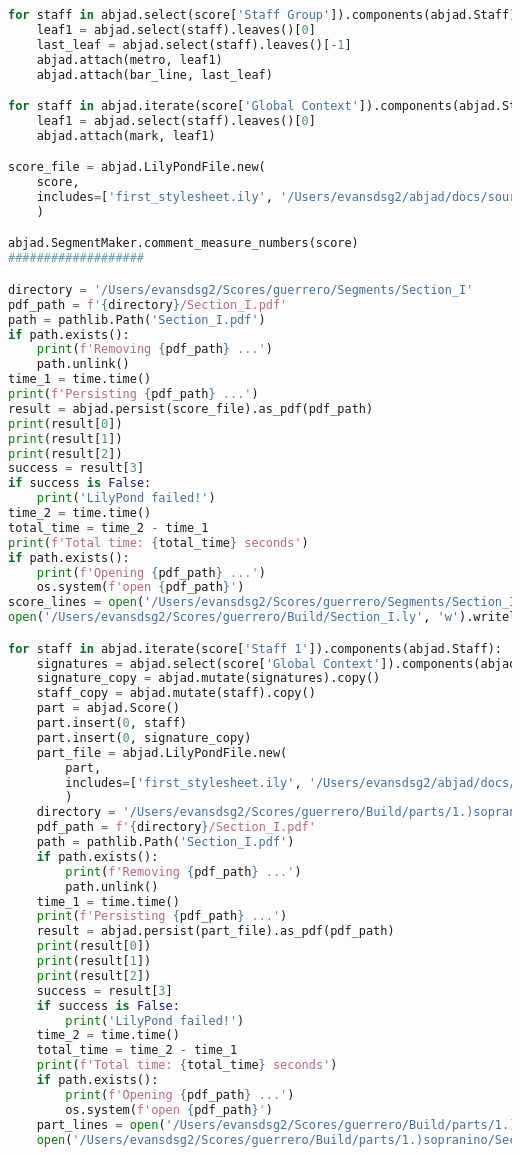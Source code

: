 \begin{lstlisting}[language=Python, caption=Invocation Source Code]
for staff in abjad.select(score['Staff Group']).components(abjad.Staff):
    leaf1 = abjad.select(staff).leaves()[0]
    last_leaf = abjad.select(staff).leaves()[-1]
    abjad.attach(metro, leaf1)
    abjad.attach(bar_line, last_leaf)

for staff in abjad.iterate(score['Global Context']).components(abjad.Staff):
    leaf1 = abjad.select(staff).leaves()[0]
    abjad.attach(mark, leaf1)

score_file = abjad.LilyPondFile.new(
    score,
    includes=['first_stylesheet.ily', '/Users/evansdsg2/abjad/docs/source/_stylesheets/abjad.ily'],
    )

abjad.SegmentMaker.comment_measure_numbers(score)
###################

directory = '/Users/evansdsg2/Scores/guerrero/Segments/Section_I'
pdf_path = f'{directory}/Section_I.pdf'
path = pathlib.Path('Section_I.pdf')
if path.exists():
    print(f'Removing {pdf_path} ...')
    path.unlink()
time_1 = time.time()
print(f'Persisting {pdf_path} ...')
result = abjad.persist(score_file).as_pdf(pdf_path)
print(result[0])
print(result[1])
print(result[2])
success = result[3]
if success is False:
    print('LilyPond failed!')
time_2 = time.time()
total_time = time_2 - time_1
print(f'Total time: {total_time} seconds')
if path.exists():
    print(f'Opening {pdf_path} ...')
    os.system(f'open {pdf_path}')
score_lines = open('/Users/evansdsg2/Scores/guerrero/Segments/Section_I/Section_I.ly').readlines()
open('/Users/evansdsg2/Scores/guerrero/Build/Section_I.ly', 'w').writelines(score_lines[15:-1])

for staff in abjad.iterate(score['Staff 1']).components(abjad.Staff):
    signatures = abjad.select(score['Global Context']).components(abjad.Staff)
    signature_copy = abjad.mutate(signatures).copy()
    staff_copy = abjad.mutate(staff).copy()
    part = abjad.Score()
    part.insert(0, staff)
    part.insert(0, signature_copy)
    part_file = abjad.LilyPondFile.new(
        part,
        includes=['first_stylesheet.ily', '/Users/evansdsg2/abjad/docs/source/_stylesheets/abjad.ily'],
        )
    directory = '/Users/evansdsg2/Scores/guerrero/Build/parts/1.)sopranino'
    pdf_path = f'{directory}/Section_I.pdf'
    path = pathlib.Path('Section_I.pdf')
    if path.exists():
        print(f'Removing {pdf_path} ...')
        path.unlink()
    time_1 = time.time()
    print(f'Persisting {pdf_path} ...')
    result = abjad.persist(part_file).as_pdf(pdf_path)
    print(result[0])
    print(result[1])
    print(result[2])
    success = result[3]
    if success is False:
        print('LilyPond failed!')
    time_2 = time.time()
    total_time = time_2 - time_1
    print(f'Total time: {total_time} seconds')
    if path.exists():
        print(f'Opening {pdf_path} ...')
        os.system(f'open {pdf_path}')
    part_lines = open('/Users/evansdsg2/Scores/guerrero/Build/parts/1.)sopranino/Section_I.ly').readlines()
    open('/Users/evansdsg2/Scores/guerrero/Build/parts/1.)sopranino/Section_I.ly', 'w').writelines(part_lines[15:-1])


\end{lstlisting}
